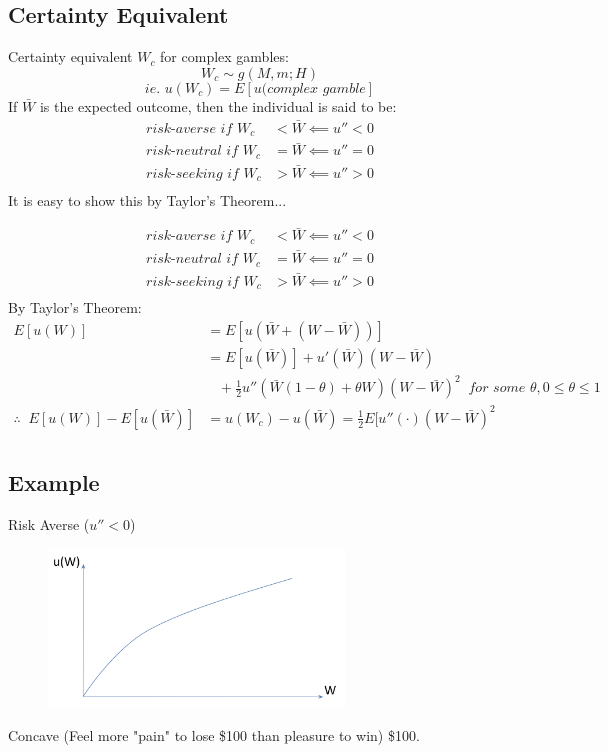 \documentclass[
14pt,notheorems,hyperref={pdfauthor=whatever}
]{beamer}
\begin{document}
\subsection{Certainty Equivalent}

\begin{frame}
Certainty equivalent $W_c$ for complex gambles:
\[W_c \sim g(M,m;H)\]
\[\textit{ie. } u(W_c) = E[u(\textit{complex gamble}]\]
\hfill \break
If $\bar{W}$ is the expected outcome, then the individual is said to be:
\begin{align*}
    \textit{risk-averse if } W_c &< \bar{W} \impliedby u''<0\\
    \textit{risk-neutral if } W_c &= \bar{W} \impliedby u''=0\\
    \textit{risk-seeking if } W_c &> \bar{W} \impliedby u''>0\\
\end{align*}
It is easy to show this by Taylor's Theorem...
\end{frame}

\begin{frame}
\begin{align*}
    \textit{risk-averse if } W_c &< \bar{W} \impliedby u''<0\\
    \textit{risk-neutral if } W_c &= \bar{W} \impliedby u''=0\\
    \textit{risk-seeking if } W_c &> \bar{W} \impliedby u''>0\\
\end{align*}
By Taylor's Theorem:
\begin{align*}
    E[u(W)] &= E[u(\bar{W}+(W-\bar{W}))]\\
    &= E[u(\bar{W})]+u'(\bar{W})(W-\bar{W})\\
    &\;\;\;+\frac{1}{2}u''(\bar{W}(1-\theta)+\theta W)(W-\bar{W})^2\;\;\textit{for some }\theta, 0 \leq \theta \leq 1\\
    \therefore \;\; E[u(W)]-E[u(\bar{W})] &= u(W_c)-u(\bar{W}) = \frac{1}{2}E[u''(\cdot)(W-\bar{W})^2\\
\end{align*}
\end{frame}

\subsection{Example}
\begin{frame}
Risk Averse ($u''<0$)\\
\begin{figure}[l2-ra]
    \includegraphics[width=0.7\textwidth]{L2-riskaverse}
    \centering
\end{figure}
Concave (Feel more "pain" to lose \$100 than pleasure to win) \$100.
\end{frame}
\end{document}
